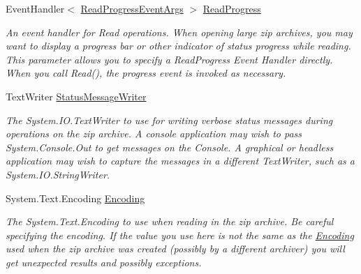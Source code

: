 \begin{DoxyCompactItemize}
\item 
Event\+Handler$<$ \mbox{\hyperlink{class_super_tiled2_unity_1_1_ionic_1_1_zip_1_1_read_progress_event_args}{Read\+Progress\+Event\+Args}} $>$ \mbox{\hyperlink{class_super_tiled2_unity_1_1_ionic_1_1_zip_1_1_read_options_ab4dc78c65a53e852df3fcdc5232383de}{Read\+Progress}}
\begin{DoxyCompactList}\small\item\em An event handler for Read operations. When opening large zip archives, you may want to display a progress bar or other indicator of status progress while reading. This parameter allows you to specify a Read\+Progress Event Handler directly. When you call {\ttfamily Read()}, the progress event is invoked as necessary. \end{DoxyCompactList}\item 
Text\+Writer \mbox{\hyperlink{class_super_tiled2_unity_1_1_ionic_1_1_zip_1_1_read_options_afbdb75da8e78c61f663cf0a623e0e4cf}{Status\+Message\+Writer}}
\begin{DoxyCompactList}\small\item\em The {\ttfamily System.\+I\+O.\+Text\+Writer} to use for writing verbose status messages during operations on the zip archive. A console application may wish to pass {\ttfamily System.\+Console.\+Out} to get messages on the Console. A graphical or headless application may wish to capture the messages in a different {\ttfamily Text\+Writer}, such as a {\ttfamily System.\+I\+O.\+String\+Writer}. \end{DoxyCompactList}\item 
System.\+Text.\+Encoding \mbox{\hyperlink{class_super_tiled2_unity_1_1_ionic_1_1_zip_1_1_read_options_ac83fac9bd2d384c0595f87717b66bff3}{Encoding}}
\begin{DoxyCompactList}\small\item\em The {\ttfamily System.\+Text.\+Encoding} to use when reading in the zip archive. Be careful specifying the encoding. If the value you use here is not the same as the \mbox{\hyperlink{namespace_super_tiled2_unity_1_1_ionic_1_1_encoding}{Encoding}} used when the zip archive was created (possibly by a different archiver) you will get unexpected results and possibly exceptions. \end{DoxyCompactList}\end{DoxyCompactItemize}


